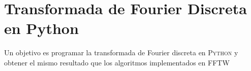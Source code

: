 \documentclass[letterpaper,11pt]{article}
\begin{document}
\section{Transformada de Fourier Discreta en Python}
\label{sec:TFP}
Un objetivo es programar la transformada de Fourier discreta en \textsc{Python} y obtener el mismo resultado que los algoritmos implementados en FFTW




\end{document}
